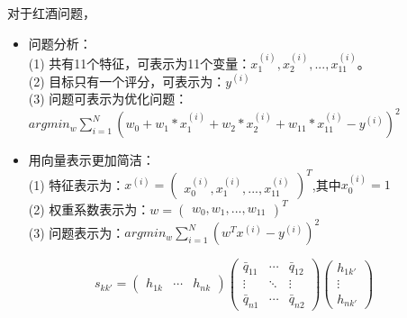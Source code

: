 \documentclass[10pt,a4paper]{ctexbook}
\begin{document}
对于红酒问题，
\begin{itemize}
\item 问题分析：
\\(1) 共有11个特征，可表示为11个变量：$x^{(i)}_1,x^{(i)}_2,...,x^{(i)}_{11}$。
\\(2) 目标只有一个评分，可表示为：$y^{(i)}$
\\(3) 问题可表示为优化问题：$argmin_{w}\sum_{i=1}^{N}(w_0 + w_1*x^{(i)}_1 + w_2*x^{(i)}_2 + w_{11}*x^{(i)}_{11} - y^{(i)})^2$

\item 用向量表示更加简洁：
\\(1) 特征表示为：$x^{(i)}=\left(\begin{array}{ccc}x^{(i)}_0,x^{(i)}_1,...,x^{(i)}_{11}\end{array}\right)^T$,其中$x^{(i)}_0=1$
\\(2) 权重系数表示为：$w=\left(\begin{array}{ccc}w_0,w_1,...,w_{11}\end{array}\right)^T$
\\(3) 问题表示为：$argmin_{w} \sum_{i=1}^{N}(w^Tx^{(i)}-y^{(i)})^2$

\end{itemize}

\begin{equation}
  s_{kk'}=
  \left(
  \begin{array}{ccc}
          h_{1k} &
          \cdots &
          h_{nk}
  \end{array}
  \right)
  \left(
  \begin{array}{ccc}
          \bar{q}_{11} & \cdots & \bar{q}_{12}\\
          \vdots & \ddots & \vdots\\
          \bar{q}_{n1} & \cdots & \bar{q}_{n2}
  \end{array}
  \right)
  \left(
  \begin{array}{c}
          h_{1k'} \\
          \vdots \\
          h_{nk'}
 \end{array}
 \right)
\end{equation}


\end{document}
